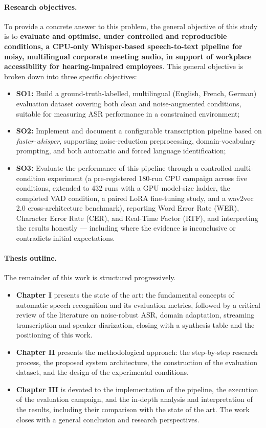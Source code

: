 \documentclass[12pt]{report}
\begin{document}
\paragraph{Research objectives.}
To provide a concrete answer to this problem, the general objective of this study is to \textbf{evaluate and optimise, under controlled and reproducible conditions, a CPU-only Whisper-based speech-to-text pipeline for noisy, multilingual corporate meeting audio, in support of workplace accessibility for hearing-impaired employees}. This general objective is broken down into three specific objectives:
\begin{itemize}
    \item \textbf{SO1:} Build a ground-truth-labelled, multilingual (English, French, German) evaluation dataset covering both clean and noise-augmented conditions, suitable for measuring ASR performance in a constrained environment;
    \item \textbf{SO2:} Implement and document a configurable transcription pipeline based on \textit{faster-whisper}, supporting noise-reduction preprocessing, domain-vocabulary prompting, and both automatic and forced language identification;
    \item \textbf{SO3:} Evaluate the performance of this pipeline through a controlled multi-condition experiment (a pre-registered 180-run CPU campaign across five conditions, extended to 432 runs with a GPU model-size ladder, the completed VAD condition, a paired LoRA fine-tuning study, and a wav2vec 2.0 cross-architecture benchmark), reporting Word Error Rate (WER), Character Error Rate (CER), and Real-Time Factor (RTF), and interpreting the results honestly --- including where the evidence is inconclusive or contradicts initial expectations.
\end{itemize}
\paragraph{Thesis outline.}
The remainder of this work is structured progressively.
\begin{itemize}
    \item \textbf{Chapter I} presents the state of the art: the fundamental concepts of automatic speech recognition and its evaluation metrics, followed by a critical review of the literature on noise-robust ASR, domain adaptation, streaming transcription and speaker diarization, closing with a synthesis table and the positioning of this work.
    \item \textbf{Chapter II} presents the methodological approach: the step-by-step research process, the proposed system architecture, the construction of the evaluation dataset, and the design of the experimental conditions.
    \item \textbf{Chapter III} is devoted to the implementation of the pipeline, the execution of the evaluation campaign, and the in-depth analysis and interpretation of the results, including their comparison with the state of the art. The work closes with a general conclusion and research perspectives.
\end{itemize}
\newpage
\end{document}
